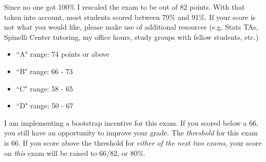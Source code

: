 \documentclass[10pt]{article}\usepackage[]{graphicx}\usepackage[]{color}
\begin{document}
Since no one got 100\% I rescaled the exam to be out of 82 points. With that taken into account, most students scored between 79\% and 91\%. If your score is not what you would like, please make use of additional resources (e.g. Stats TAs, Spinelli Center tutoring, my office hours, study groups with fellow students, etc.)

\begin{itemize}
  \itemsep0em
  \item ``A" range: 74 points or above
  \item ``B" range: 66 - 73
  \item ``C" range: 58 - 65
  \item ``D" range: 50 - 67
\end{itemize}

I am implementing a bootstrap incentive for this exam. If you scored below a 66, you still have an opportunity to improve your grade. The \emph{threshold} for this exam is 66. If you score above the threshold for \emph{either of the next two exams}, your score on \emph{this} exam will be raised to 66/82, or 80\%.

% 
% 
% 
% 
% 
% 
\end{document}
